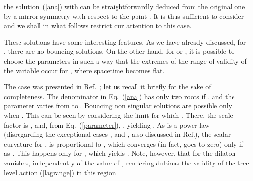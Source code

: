 \documentclass[a4paper,aps,twocolumn,prd,showpacs,nofootinbib]{revtex4}
\begin{document}
the solution~(\ref{ana}) with \coordHE{} can be straightforwardly
deduced from the original one by a mirror symmetry with respect to the
point \coordHE{}. It is thus sufficient to consider \coordHE{}
and we shall in what follows restrict our attention to this case.

These solutions have some interesting features. As we have already
discussed, for \coordHE{}, there are no bouncing solutions. On the other
hand, for \coordHE{} or \coordHE{}, it is possible to choose the parameters
in such a way that the extremes of the range of validity of the
variable \myHighlight{$\theta$}\coordHE{} occur for \coordHE{}, where
spacetime becomes flat.

The case \coordHE{} was presented in Ref.~\cite{picco}; let us recall it
briefly for the sake of completeness.  The denominator in
Eq.~(\ref{ana}) has only two roots if \coordHE{}, and the parameter
\myHighlight{$\theta$}\coordHE{} varies from \coordHE{} to \coordHE{}. Bouncing non singular solutions are
possible only when \coordHE{}. This can be seen by
considering the limit for which \coordHE{}. There,
the scale factor is \coordHE{}, and, from
Eq.~(\ref{parameter}), \coordHE{}, yielding
\coordHE{}. As \coordHE{} is a power law (disregarding
the exceptional cases \coordHE{}, and
\coordHE{}, also discussed in
Ref.\cite{picco}), the scalar curvature for \coordHE{}, is proportional to
\coordHE{}, which converges (in fact, goes to zero) only if \coordHE{} as \coordHE{}. This happens only for \coordHE{}, which yields
\coordHE{}.  Note, however, that for \coordHE{} the
dilaton \myHighlight{$\phi$}\coordHE{} vanishes, independently of the value of \myHighlight{$\omega$}\coordHE{},
rendering dubious the validity of the tree level action
(\ref{lagrange}) in this region.
\end{document}

